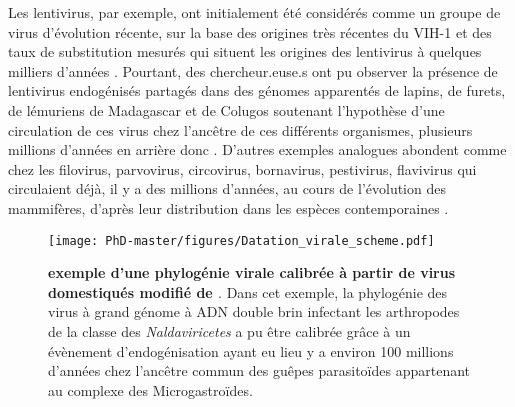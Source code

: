 Les lentivirus, par exemple, ont initialement été considérés comme un groupe de virus d'évolution récente, sur la base des origines très récentes du VIH-1 et des taux de substitution mesurés qui situent les origines des lentivirus à quelques milliers d'années \citep{sharp_origins_2000}. Pourtant, des chercheur.euse.s ont pu observer la présence de lentivirus endogénisés partagés dans des génomes apparentés de lapins, de furets, de lémuriens de Madagascar et de Colugos soutenant l'hypothèse d'une circulation de ces virus chez l'ancêtre de ces différents organismes, plusieurs millions d'années en arrière donc \citep{hron_life_2016,katzourakis_discovery_2007}. D'autres exemples analogues abondent comme chez les filovirus, parvovirus, circovirus, bornavirus, pestivirus, flavivirus qui circulaient déjà, il y a des millions d'années, au cours de l'évolution des mammifères, d'après leur distribution dans les espèces contemporaines \citep{katzourakis_endogenous_2010,taylor_filoviruses_2010,li_endogenous_2022}.

\begin{figure}[!htpb]
\captionsetup{font=footnotesize}
 \centering
  \texttt{[image: PhD-master/figures/Datation\_virale\_scheme.pdf]}
\caption[Intro:exemple de datation virale à partir d'EVEs]{\textbf{exemple d'une phylogénie virale calibrée à partir de virus domestiqués modifié de \cite{theze_paleozoic_2011}}. Dans cet exemple, la phylogénie des virus à grand génome à ADN double brin infectant les arthropodes de la classe des \textit{Naldaviricetes} a pu être calibrée grâce à un évènement d'endogénisation ayant eu lieu y a environ 100 millions d'années chez l'ancêtre commun des guêpes parasitoïdes appartenant au complexe des Microgastroïdes.}
\label{figure:Datation_virale_scheme}
\end{figure}

